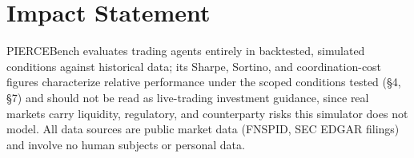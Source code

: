 \documentclass{article}
\begin{document}
\section*{Impact Statement}
PIERCEBench evaluates trading agents entirely in backtested, simulated conditions against historical data; its Sharpe, Sortino, and coordination-cost figures characterize relative performance under the scoped conditions tested (\S4, \S7) and should not be read as live-trading investment guidance, since real markets carry liquidity, regulatory, and counterparty risks this simulator does not model. All data sources are public market data (FNSPID, SEC EDGAR filings) and involve no human subjects or personal data. %
\end{document}
